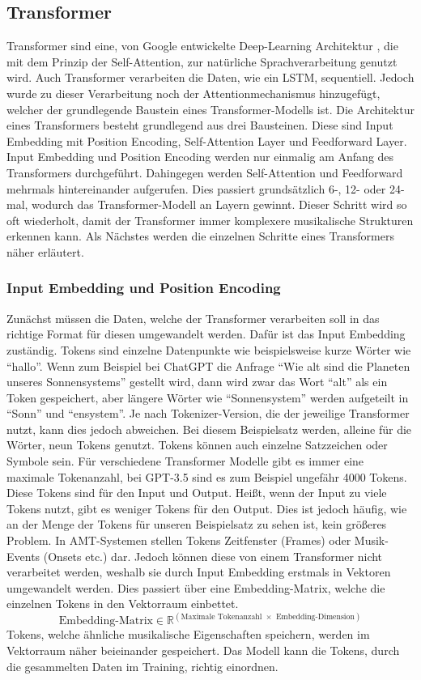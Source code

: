 \subsection{Transformer}
Transformer sind eine, von Google entwickelte Deep-Learning Architektur \cite{vaswani2017attention},
die mit dem Prinzip der Self-Attention, zur natürliche Sprachverarbeitung genutzt wird.
Auch Transformer verarbeiten die Daten, wie ein LSTM, sequentiell.
Jedoch wurde zu dieser Verarbeitung noch der Attentionmechanismus hinzugefügt,
welcher der grundlegende Baustein eines Transformer-Modells ist.
Die Architektur eines Transformers besteht grundlegend aus drei Bausteinen.
Diese sind Input Embedding mit Position Encoding, Self-Attention Layer und Feedforward Layer.
Input Embedding und Position Encoding werden nur einmalig am Anfang des Transformers durchgeführt.
Dahingegen werden Self-Attention und Feedforward mehrmals hintereinander aufgerufen.
Dies passiert grundsätzlich 6-, 12- oder 24-mal, wodurch das Transformer-Modell an Layern gewinnt.
Dieser Schritt wird so oft wiederholt, damit der Transformer immer komplexere musikalische Strukturen erkennen kann.
Als Nächstes werden die einzelnen Schritte eines Transformers näher erläutert.

\subsubsection{Input Embedding und Position Encoding}
Zunächst müssen die Daten, welche der Transformer verarbeiten soll in das richtige Format für diesen umgewandelt werden.
Dafür ist das Input Embedding zuständig.
Tokens sind einzelne Datenpunkte wie beispielsweise kurze Wörter wie \enquote{hallo}.
Wenn zum Beispiel bei ChatGPT die Anfrage \enquote{Wie alt sind die Planeten unseres Sonnensystems} gestellt wird,
dann wird zwar das Wort \enquote{alt} als ein Token gespeichert, aber längere Wörter wie \enquote{Sonnensystem}
werden aufgeteilt in \enquote{Sonn} und \enquote{ensystem}.
Je nach Tokenizer-Version, die der jeweilige Transformer nutzt, kann dies jedoch abweichen.
Bei diesem Beispielsatz werden, alleine für die Wörter, neun Tokens genutzt.
Tokens können auch einzelne Satzzeichen oder Symbole sein.
Für verschiedene Transformer Modelle gibt es immer eine maximale Tokenanzahl,
bei GPT-3.5 sind es zum Beispiel ungefähr 4000 Tokens.
Diese Tokens sind für den Input und Output.
Heißt, wenn der Input zu viele Tokens nutzt, gibt es weniger Tokens für den Output.
Dies ist jedoch häufig, wie an der Menge der Tokens für unseren Beispielsatz zu sehen ist, kein größeres Problem.
In AMT-Systemen stellen Tokens Zeitfenster (Frames) oder Musik-Events (Onsets etc.) dar.
Jedoch können diese von einem Transformer nicht verarbeitet werden,
weshalb sie durch Input Embedding erstmals in Vektoren umgewandelt werden.
Dies passiert über eine Embedding-Matrix, welche die einzelnen Tokens in den Vektorraum einbettet.
\[
\displaystyle
\text{Embedding-Matrix} \in \mathbb{R}^{\left( \text{Maximale Tokenanzahl } \times \text{ Embedding-Dimension} \right)}
\]
Tokens, welche ähnliche musikalische Eigenschaften speichern, werden im Vektorraum näher beieinander gespeichert.
Das Modell kann die Tokens, durch die gesammelten Daten im Training, richtig einordnen.

